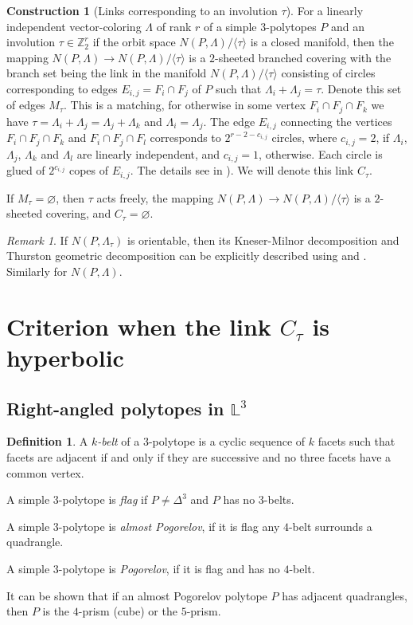 \documentclass[12pt]{amsart}
\theoremstyle{definition}
\newtheorem{definition}[formula]{Definition}
\newtheorem{construction}[formula]{Construction}
\theoremstyle{remark}
\newtheorem{remark}[formula]{Remark}
\begin{document}
\begin{construction}[Links corresponding to an involution $\tau$]
For a linearly independent vector-coloring $\Lambda$ of rank $r$ of a simple $3$-polytopes $P$ and an involution
$\tau\in\mathbb Z_2^r$ if the orbit space $N(P,\Lambda)/\langle\tau\rangle$ is a closed manifold, then
the mapping $N(P,\Lambda)\to N(P,\Lambda)/\langle\tau\rangle$ is a $2$-sheeted branched covering with the branch set being 
the link in the manifold $N(P,\Lambda)/\langle\tau\rangle$ 
consisting of circles corresponding to edges $E_{i,j}=F_i\cap F_j$ of $P$ 
such that $\Lambda_i+\Lambda_j=\tau$. Denote this set of edges $M_\tau$. This is a matching, for otherwise in
some vertex $F_i\cap F_j\cap F_k$ we have $\tau=\Lambda_i+\Lambda_j=\Lambda_j+\Lambda_k$ and $\Lambda_i=\Lambda_j$.
The edge $E_{i,j}$ connecting the vertices $F_i\cap F_j\cap F_k$
and $F_i\cap F_j\cap F_l$ corresponds to $2^{r-2-c_{i,j}}$ circles, where $c_{i,j}=2$, if $\Lambda_i$, $\Lambda_j$,
$\Lambda_k$ and $\Lambda_l$ are linearly independent, and $c_{i,j}=1$, otherwise. Each circle is glued of $2^{c_{i,j}}$ copes
of $E_{i,j}$. The details see in \cite[Proposition 4.31]{E26}). We will denote this link $C_\tau$. 

If $M_\tau=\varnothing$, then $\tau$ acts freely,
the mapping $N(P,\Lambda)\to N(P,\Lambda)/\langle\tau\rangle$ is a $2$-sheeted covering, and $C_\tau=\varnothing$.
\end{construction}
\begin{remark}
If $N(P,\Lambda_\tau)$ is orientable, then its Kneser-Milnor decomposition and Thurston geometric decomposition
can be explicitly described using \cite[Lemmas 10.4 and 10.6]{E24} and \cite[Theorems 3.12 and 4.12]{E22a}. 
Similarly for $N(P,\Lambda)$.
\end{remark}

\section{Criterion when the link $C_\tau$ is hyperbolic}

\subsection{Right-angled polytopes in $\mathbb L^3$}
\begin{definition}
A {\it $k$-belt} of a $3$-polytope 
is a cyclic sequence of $k$ facets such that facets are adjacent if and only if they are successive and no
three facets have a common vertex. 

A simple $3$-polytope is {\it flag} if $P\ne\Delta^3$ and $P$ has no $3$-belts.

A simple $3$-polytope is {\it almost Pogorelov}, if it is flag any $4$-belt surrounds a quadrangle. 

A simple $3$-polytope is {\it Pogorelov}, if it is flag and has no $4$-belt.
\end{definition}
It can be shown that if an almost Pogorelov polytope $P$  has adjacent quadrangles, then $P$ is the $4$-prism (cube) or the 
$5$-prism.
\end{document}
